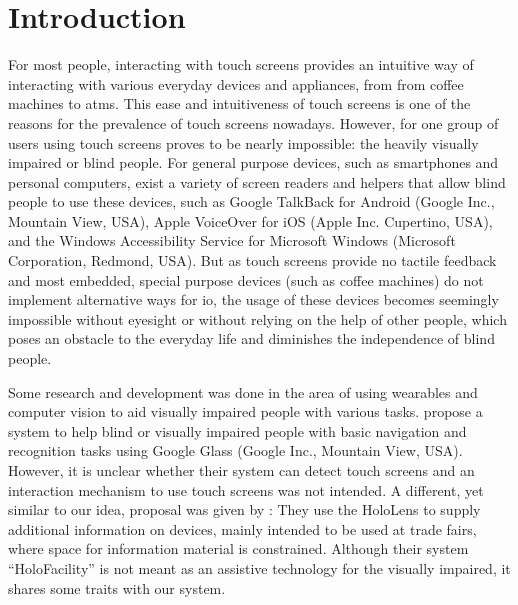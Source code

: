 \section{Introduction}

For most people, interacting with touch screens provides an intuitive way of interacting with various everyday devices and appliances, from from coffee machines to \acp{atm}.
This ease and intuitiveness of touch screens is one of the reasons for the prevalence of touch screens nowadays.
However, for one group of users using touch screens proves to be nearly impossible: the heavily visually impaired or blind people.
For general purpose devices, such as smartphones and personal computers, exist a variety of screen readers and helpers that allow blind people to use these devices, such as Google TalkBack for Android \cite{talkback} (Google Inc., Mountain View, USA), Apple VoiceOver for iOS \cite{voiceover} (Apple Inc. Cupertino, USA), and the Windows Accessibility Service for Microsoft Windows \cite{windowsaccessibility} (Microsoft Corporation, Redmond, USA). 
But as touch screens provide  no tactile feedback and most embedded, special purpose devices (such as coffee machines) do not implement alternative ways for \ac{io}, the usage of these devices becomes seemingly impossible without eyesight or without relying on the help of other people, which poses an obstacle to the everyday life and diminishes the independence of blind people.

Some research and development was done in the area of using wearables and computer vision to aid visually impaired people with various tasks.
\textcite{googleglass} propose a system to help blind or visually impaired people with basic navigation and recognition tasks using Google Glass (Google Inc., Mountain View, USA).
However, it is unclear whether their system can detect touch screens and an interaction mechanism to use touch screens was not intended.
A different, yet similar to our idea, proposal was given by \textcite{holofacility}: They use the HoloLens to supply additional information on devices, mainly intended to be used at trade fairs, where space for information material is constrained.
Although their system \enquote{HoloFacility} is not meant as an assistive technology for the visually impaired, it shares some traits with our system.


